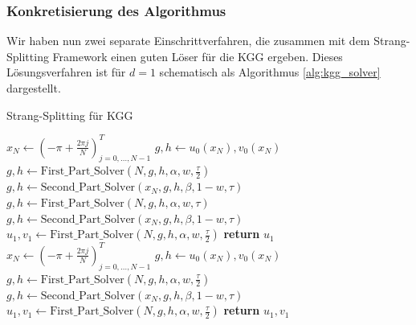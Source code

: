 \subsubsection*{Konkretisierung des Algorithmus}
Wir haben nun zwei separate Einschrittverfahren, die zusammen mit dem Strang-Splitting Framework einen guten Löser für die KGG ergeben. Dieses Lösungsverfahren ist für $d=1$ schematisch als Algorithmus \ref{alg:kgg_solver} dargestellt.
\begin{algorithm}[ht]
    \caption{Strang-Splitting für KGG}
    \label{alg:kgg_solver}
    \begin{algorithmic}[1] %
    		\State $x_N\gets (-\pi+\frac{2\pi j}{N})_{j=0,\dots,N-1}^T$
            \State $g,h\gets u_0(x_N), v_0(x_N)$
            \State $g,h\gets \text{First\_Part\_Solver}(N, g, h, \alpha, w, \frac{\tau}{2})$
            \State $g,h\gets \text{Second\_Part\_Solver}(x_N, g, h, \beta, 1-w, \tau)$
              
            	\State $g,h\gets \text{First\_Part\_Solver}(N, g, h, \alpha, w, \tau)$
            	\State $g,h\gets \text{Second\_Part\_Solver}(x_N, g, h, \beta, 1-w, \tau)$
            \EndFor
            \State $u_1,v_1\gets \text{First\_Part\_Solver}(N, g, h, \alpha, w, \frac{\tau}{2})$            
            \State \textbf{return} $u_1$ 
    	\EndFunction
            \State $x_N\gets (-\pi+\frac{2\pi j}{N})_{j=0,\dots,N-1}^T$
            \State $g,h\gets u_0(x_N), v_0(x_N)$
            \State $g,h\gets \text{First\_Part\_Solver}(N, g, h, \alpha, w, \frac{\tau}{2})$
            \State $g,h\gets \text{Second\_Part\_Solver}(x_N, g, h, \beta, 1-w, \tau)$
            \State $u_1,v_1\gets \text{First\_Part\_Solver}(N, g, h, \alpha, w, \frac{\tau}{2})$
            \State \textbf{return} $u_1, v_1$
        \EndFunction
        

\end{algorithmic}
\end{algorithm}
